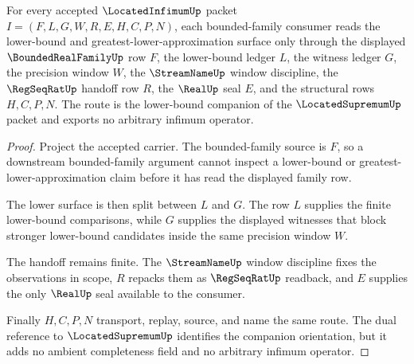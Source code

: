 \begin{theorem}
\label{thm:located-infimum-bounded-family-handoff}
For every accepted $\LocatedInfimumUp$ packet $I=(F,L,G,W,R,E,H,C,P,N)$, each bounded-family consumer reads the lower-bound and greatest-lower-approximation surface only through the displayed $\BoundedRealFamilyUp$ row $F$, the lower-bound ledger $L$, the witness ledger $G$, the precision window $W$, the $\StreamNameUp$ window discipline, the $\RegSeqRatUp$ handoff row $R$, the $\RealUp$ seal $E$, and the structural rows $H,C,P,N$. The route is the lower-bound companion of the $\LocatedSupremumUp$ packet and exports no arbitrary infimum operator.
\end{theorem}
\begin{proof}
Project the accepted carrier. The bounded-family source is $F$, so a downstream bounded-family argument cannot inspect a lower-bound or greatest-lower-approximation claim before it has read the displayed family row.

The lower surface is then split between $L$ and $G$. The row $L$ supplies the finite lower-bound comparisons, while $G$ supplies the displayed witnesses that block stronger lower-bound candidates inside the same precision window $W$.

The handoff remains finite. The $\StreamNameUp$ window discipline fixes the observations in scope, $R$ repacks them as $\RegSeqRatUp$ readback, and $E$ supplies the only $\RealUp$ seal available to the consumer.

Finally $H,C,P,N$ transport, replay, source, and name the same route. The dual reference to $\LocatedSupremumUp$ identifies the companion orientation, but it adds no ambient completeness field and no arbitrary infimum operator.
\end{proof}

